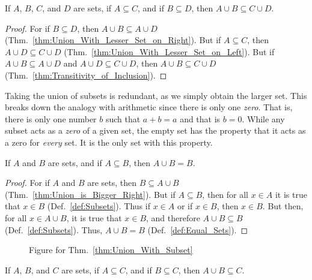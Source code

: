         \begin{theorem}
            \label{thm:A_cup_B_Subset_C_cup_D}%
            If $A$, $B$, $C$, and $D$ are sets, if $A\subseteq{C}$, and if
            $B\subseteq{D}$, then $A\cup{B}\subseteq{C}\cup{D}$.
        \end{theorem}
        \begin{proof}
            For if $B\subseteq{D}$, then $A\cup{B}\subseteq{A}\cup{D}$
            (Thm.~\ref{thm:Union_With_Lesser_Set_on_Right}). But if
            $A\subseteq{C}$, then $A\cup{D}\subseteq{C}\cup{D}$
            (Thm.~\ref{thm:Union_With_Lesser_Set_on_Left}). But if
            $A\cup{B}\subseteq{A}\cup{D}$ and $A\cup{D}\subseteq{C}\cup{D}$,
            then $A\cup{B}\subseteq{C}\cup{D}$
            (Thm.~\ref{thm:Transitivity_of_Inclusion}).
        \end{proof}
        Taking the union of subsets is redundant, as we simply obtain the larger
        set. This breaks down the analogy with arithmetic since there is only
        one \textit{zero}. That is, there is only one number $b$ such that
        $a+b=a$ and that is $b=0$. While any subset acts as a \textit{zero} of
        a given set, the empty set has the property that it acts as a zero for
        \textit{every} set. It is the only set with this property.
        \begin{theorem}
            \label{thm:Union_With_Subset}%
            If $A$ and $B$ are sets, and if $A\subseteq{B}$, then $A\cup{B}=B$.
        \end{theorem}
        \begin{proof}
            For if $A$ and $B$ are sets, then $B\subseteq{A}\cup{B}$
            (Thm.~\ref{thm:Union_is_Bigger_Right}). But if $A\subseteq{B}$, then
            for all $x\in{A}$ it is true that $x\in{B}$
            (Def.~\ref{def:Subsets}). Thus if $x\in{A}$ or if $x\in{B}$, then
            $x\in{B}$. But then, for all $x\in{A}\cup{B}$, it is true that
            $x\in{B}$, and therefore $A\cup{B}\subseteq{B}$
            (Def.~\ref{def:Subsets}). Thus, $A\cup{B}=B$
            (Def.~\ref{def:Equal_Sets}).
        \end{proof}
        \begin{figure}[H]
            \centering
            \captionsetup{type=figure}
            
            \caption{Figure for Thm.~\ref{thm:Union_With_Subset}}
            \label{fig:Thm_Union_with_Subset}
        \end{figure}
        \begin{theorem}
            \label{thm:Union_of_Subsets_is_Still_Subset}%
            If $A$, $B$, and $C$ are sets, if $A\subseteq{C}$, and if
            $B\subseteq{C}$, then $A\cup{B}\subseteq{C}$.
        \end{theorem}
